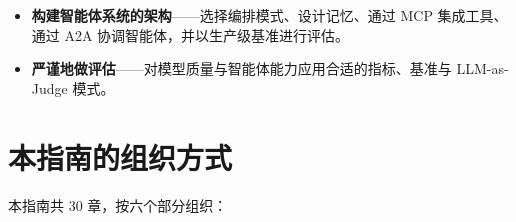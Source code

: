\documentclass[11pt,a4paper,openany]{book}
\begin{document}
\begin{itemize}
  \item \textbf{构建智能体系统的架构}——选择编排模式、设计记忆、通过 MCP 集成工具、通过 A2A 协调智能体，并以生产级基准进行评估。
  \item \textbf{严谨地做评估}——对模型质量与智能体能力应用合适的指标、基准与 LLM-as-Judge 模式。
\end{itemize}

\section*{本指南的组织方式}
\label{how-this-guide-is-organized}

本指南共 30 章，按六个部分组织：
\end{document}
